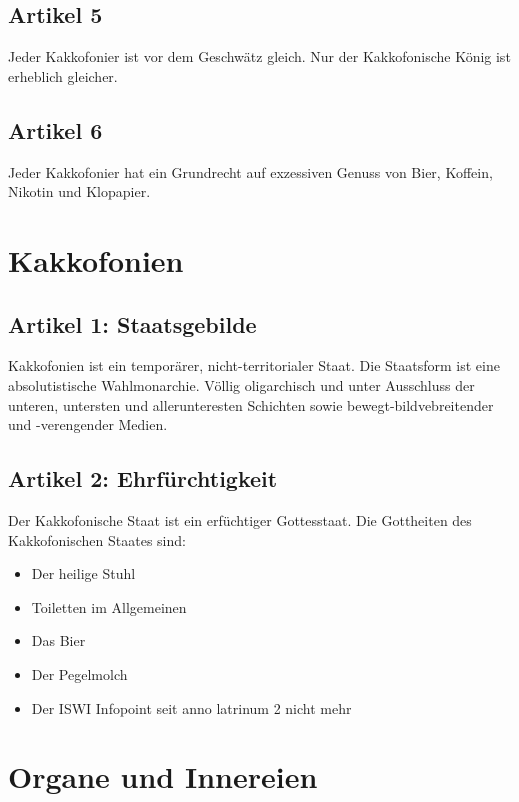 \documentclass[ngerman, fontsize=12pt, parskip=half, footsepline]{scrartcl}
\begin{document}
\subsection*{Artikel 5}
Jeder Kakkofonier ist vor dem Geschwätz gleich. Nur der Kakkofonische König ist erheblich gleicher.

\subsection*{Artikel 6}
Jeder Kakkofonier hat ein Grundrecht auf exzessiven Genuss von Bier, Koffein, Nikotin und Klopapier.

\section{Kakkofonien}

\subsection*{Artikel 1: Staatsgebilde}
Kakkofonien ist ein temporärer, nicht-territorialer Staat. Die Staatsform ist eine absolutistische Wahlmonarchie. Völlig oligarchisch und unter Ausschluss der unteren, untersten und allerunteresten Schichten sowie bewegt-bildvebreitender und -verengender  Medien.

\subsection*{Artikel 2: Ehrfürchtigkeit}
Der Kakkofonische Staat ist ein erfüchtiger Gottesstaat. Die Gottheiten des Kakkofonischen Staates sind:
\begin{itemize}
	\item Der heilige Stuhl
	\item Toiletten im Allgemeinen
	\item Das Bier
	\item Der Pegelmolch
	\item Der ISWI Infopoint seit anno latrinum 2 nicht mehr
\end{itemize}
\section{Organe und Innereien}
\end{document}
